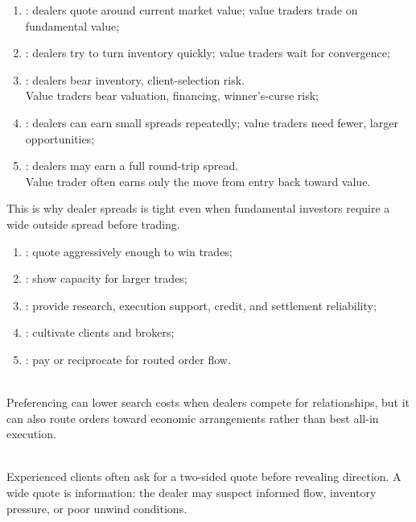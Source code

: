 \begin{taxonomy} 
\begin{enumerate}[label=\roman*.]
\setlength{\itemsep}{0pt}
\item {}: dealers quote around current market value; value traders trade on fundamental value;
\item {}: dealers try to turn inventory quickly; value traders wait for convergence;
\item {}: dealers bear inventory, client-selection risk.\\
Value traders bear valuation, financing, winner's-curse risk;
\item {}: dealers can earn small spreads repeatedly; value traders need fewer, larger opportunities;
\item {}: dealers may earn a full round-trip spread.\\
Value trader often earns only the move from entry back toward value.
\end{enumerate}
This is why dealer spreads is tight even when fundamental investors require a wide outside spread before trading.
\end{taxonomy}

\begin{taxonomy} 
\begin{enumerate}[label=\roman*.]
\setlength{\itemsep}{0pt}
\item {}: quote aggressively enough to win trades;
\item {}: show capacity for larger trades;
\item {}: provide research, execution support, credit, and settlement reliability;
\item {}: cultivate clients and brokers;
\item {}: pay or reciprocate for routed order flow.
\end{enumerate}
\end{taxonomy}

\begin{caveat} \\
Preferencing can lower search costs when dealers compete for relationships, but it can also route orders toward economic arrangements rather than best all-in execution.
\end{caveat}

\begin{practitionernote} \\
Experienced clients often ask for a two-sided quote before revealing direction. A wide quote is information: the dealer may suspect informed flow, inventory pressure, or poor unwind conditions.
\end{practitionernote}

